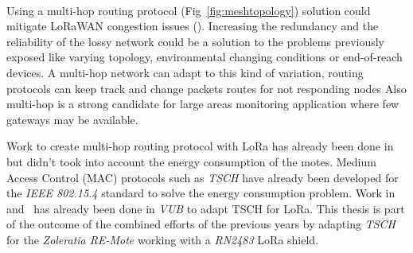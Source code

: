 


\paragraph{}


Using a multi-hop routing protocol (Fig~\ref{fig:meshtopology}) solution
could mitigate LoRaWAN congestion issues (\cite{8115756}).
Increasing the redundancy and the reliability of the lossy network could be a
solution to the problems previously exposed like varying topology,
environmental changing conditions or end-of-reach devices.
A multi-hop network can adapt to this kind of variation, routing protocols can
keep track and change packets routes for not responding nodes
Also multi-hop is a strong candidate for large areas monitoring application
where few gateways may be available.

Work to create multi-hop routing protocol with LoRa has already been
done in~\cite{8115756} but didn't took into account the energy consumption of
the motes.
Medium Access Control (MAC) protocols such as \emph{TSCH} have
already been developed for the \emph{IEEE 802.15.4} standard to solve the
energy consumption problem.
Work in~\cite{8847137} and~\cite{njomgang_2018} has already been done in
\emph{VUB} to adapt TSCH for LoRa.
This thesis is part of the outcome of the combined efforts of the previous
years by adapting \emph{TSCH} for the \emph{Zoleratia RE-Mote} working with a
\emph{RN2483} LoRa shield.
